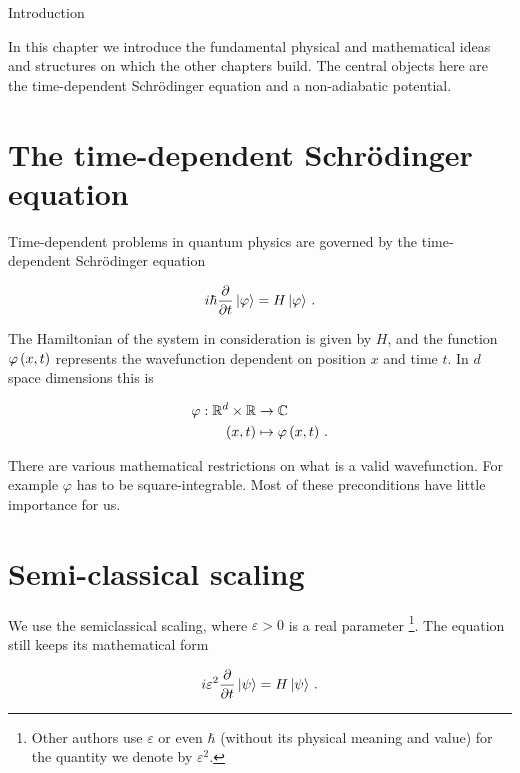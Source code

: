 \begin{chapter}{Introduction}
\label{ch:introduction}

In this chapter we introduce the fundamental physical and mathematical ideas and
structures on which the other chapters build. The central objects here are the
time-dependent Schrödinger equation and a non-adiabatic potential.


\section{The time-dependent Schrödinger equation}

Time-dependent problems in quantum physics are governed by the time-dependent
Schrödinger equation

\begin{equation} \label{eq:basics_tdse_simple}
  i \hbar \frac{\partial}{\partial t} \Ket{\varphi} = H \Ket{\varphi} \,.
\end{equation}

The Hamiltonian of the system in consideration is given by $H$, and the function
$\varphi\left( x,t \right)$ represents the wavefunction dependent on position $x$ and
time $t$. In $d$ space dimensions this is

\begin{align*}
  \varphi : \mathbb{R}^d \times \mathbb{R} & \rightarrow \mathbb{C} \\
                       \left( x, t \right) & \mapsto \varphi\left( x,t \right) \,.
\end{align*}

There are various mathematical restrictions on what is a valid wavefunction. For
example $\varphi$ has to be square-integrable. Most of these preconditions have
little importance for us.

\section{Semi-classical scaling}

We use the semiclassical scaling, where $\varepsilon > 0$ is a real parameter
\footnote{Other authors use $\varepsilon$ or even $\hbar$ (without its physical
meaning and value) for the quantity we denote by $\varepsilon^2$.}. The equation
still keeps its mathematical form

\begin{equation} \label{eq:basics_tdse_semi}
  i \varepsilon^2 \frac{\partial}{\partial t} \Ket{\psi} = H \Ket{\psi} \,.
\end{equation}


\end{chapter}
